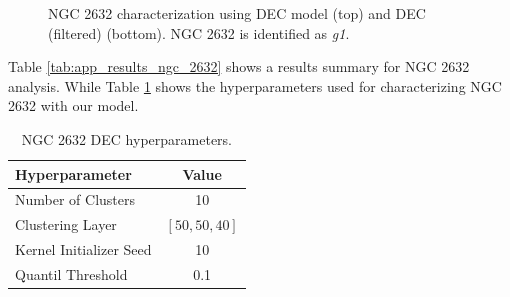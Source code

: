 \documentclass[11pt,a4paper,english,twocolumn]{article}
\begin{document}
\begin{figure}[htbp]
\begin{subfigure}{\columnwidth}
\begin{subfigure}[t]{0.30\textwidth}
    \end{subfigure}
  \end{subfigure}
  \caption{NGC 2632 characterization using DEC model (top) and DEC (filtered) (bottom).
           NGC 2632 is identified as \emph{g1}.}
  \label{fig:app_result_ngc_2632_dec}
\end{figure}

\begin{table}[htbp]
  \begin{center}
    \caption{NGC 2632 results.}
    \label{tab:app_results_ngc_2632}
  \end{center}
\end{table}

Table \ref{tab:app_results_ngc_2632} shows a results summary for NGC 2632 analysis.
While Table \ref{tab:app_hyperparameters_ngc_2632} shows the hyperparameters
used for characterizing NGC 2632 with our model.

\begin{table}[htbp]
  \begin{center}
    \begin{tabular}{l|c}
      \textbf{Hyperparameter} & \textbf{Value} \\
      \hline
      Number of Clusters & 10 \\
      Clustering Layer & $\left[ 50, 50, 40 \right]$ \\
      Kernel Initializer Seed & 10 \\
      Quantil Threshold & 0.1 \\
    \end{tabular}
    \caption{NGC 2632 DEC hyperparameters.}
    \label{tab:app_hyperparameters_ngc_2632}
  \end{center}
\end{table}
\end{document}
